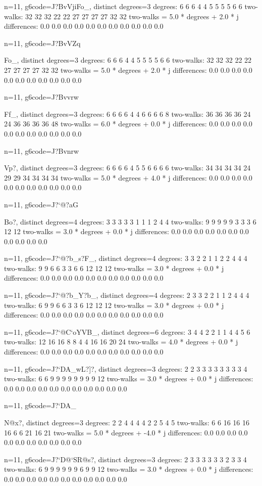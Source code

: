 {{{{{{{{{n=11, g6code=J?BvVji}Fo_, distinct degrees=3
degrees: 6 6 6 4 4 5 5 5 5 6 6 
two-walks: 32 32 32 22 22 27 27 27 27 32 32 
two-walks = 5.0 * degrees + 2.0 * j
differences: 0.0 0.0 0.0 0.0 0.0 0.0 0.0 0.0 0.0 0.0 0.0 

n=11, g6code=J?BvVZq}Fo_, distinct degrees=3
degrees: 6 6 6 4 4 5 5 5 5 6 6 
two-walks: 32 32 32 22 22 27 27 27 27 32 32 
two-walks = 5.0 * degrees + 2.0 * j
differences: 0.0 0.0 0.0 0.0 0.0 0.0 0.0 0.0 0.0 0.0 0.0 

n=11, g6code=J?Bvvrw}Ff_, distinct degrees=3
degrees: 6 6 6 6 4 4 6 6 6 6 8 
two-walks: 36 36 36 36 24 24 36 36 36 36 48 
two-walks = 6.0 * degrees + 0.0 * j
differences: 0.0 0.0 0.0 0.0 0.0 0.0 0.0 0.0 0.0 0.0 0.0 

n=11, g6code=J?Bvnrw}Vp?, distinct degrees=3
degrees: 6 6 6 6 4 5 5 6 6 6 6 
two-walks: 34 34 34 34 24 29 29 34 34 34 34 
two-walks = 5.0 * degrees + 4.0 * j
differences: 0.0 0.0 0.0 0.0 0.0 0.0 0.0 0.0 0.0 0.0 0.0 

n=11, g6code=J?`@?aG{Bo?, distinct degrees=4
degrees: 3 3 3 3 3 1 1 1 2 4 4 
two-walks: 9 9 9 9 9 3 3 3 6 12 12 
two-walks = 3.0 * degrees + 0.0 * j
differences: 0.0 0.0 0.0 0.0 0.0 0.0 0.0 0.0 0.0 0.0 0.0 

n=11, g6code=J?`@?b_s?F_, distinct degrees=4
degrees: 3 3 2 2 1 1 2 2 4 4 4 
two-walks: 9 9 6 6 3 3 6 6 12 12 12 
two-walks = 3.0 * degrees + 0.0 * j
differences: 0.0 0.0 0.0 0.0 0.0 0.0 0.0 0.0 0.0 0.0 0.0 

n=11, g6code=J?`@?b_Y?b_, distinct degrees=4
degrees: 2 3 3 2 2 1 1 2 4 4 4 
two-walks: 6 9 9 6 6 3 3 6 12 12 12 
two-walks = 3.0 * degrees + 0.0 * j
differences: 0.0 0.0 0.0 0.0 0.0 0.0 0.0 0.0 0.0 0.0 0.0 

n=11, g6code=J?`@C`oYVB_, distinct degrees=6
degrees: 3 4 4 2 2 1 1 4 4 5 6 
two-walks: 12 16 16 8 8 4 4 16 16 20 24 
two-walks = 4.0 * degrees + 0.0 * j
differences: 0.0 0.0 0.0 0.0 0.0 0.0 0.0 0.0 0.0 0.0 0.0 

n=11, g6code=J?`DA_wL?]?, distinct degrees=3
degrees: 2 2 3 3 3 3 3 3 3 3 4 
two-walks: 6 6 9 9 9 9 9 9 9 9 12 
two-walks = 3.0 * degrees + 0.0 * j
differences: 0.0 0.0 0.0 0.0 0.0 0.0 0.0 0.0 0.0 0.0 0.0 

n=11, g6code=J?`DA_{N@x?, distinct degrees=3
degrees: 2 2 4 4 4 4 2 2 5 4 5 
two-walks: 6 6 16 16 16 16 6 6 21 16 21 
two-walks = 5.0 * degrees + -4.0 * j
differences: 0.0 0.0 0.0 0.0 0.0 0.0 0.0 0.0 0.0 0.0 0.0 

n=11, g6code=J?`D@`SR@s?, distinct degrees=3
degrees: 2 3 3 3 3 3 3 2 3 3 4 
two-walks: 6 9 9 9 9 9 9 6 9 9 12 
two-walks = 3.0 * degrees + 0.0 * j
differences: 0.0 0.0 0.0 0.0 0.0 0.0 0.0 0.0 0.0 0.0 0.0 

}}}}}}}
